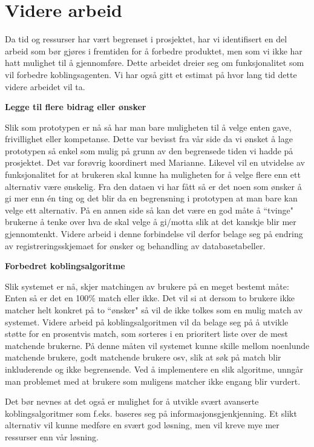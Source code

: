 \section{Videre arbeid}

Da tid og ressurser har vært begrenset i prosjektet, har vi identifisert en del arbeid som bør gjøres i fremtiden for å forbedre produktet, men som vi ikke har hatt mulighet til å gjennomføre. Dette arbeidet dreier seg om funksjonalitet som vil forbedre koblingsagenten. Vi har også gitt et estimat på hvor lang tid dette videre arbeidet vil ta.

{\bf Legge til flere bidrag eller ønsker}

Slik som prototypen er nå så har man bare muligheten til å velge enten gave, frivillighet eller kompetanse. Dette var bevisst fra vår side da vi ønsket å lage prototypen så enkel som mulig på grunn av den begrensede tiden vi hadde på prosjektet. Det var forøvrig koordinert med Marianne. Likevel vil en utvidelse av funksjonalitet for at brukeren skal kunne ha muligheten for å velge flere enn ett alternativ være ønskelig. Fra den dataen vi har fått så er det noen som ønsker å gi mer enn én ting og det blir da en begrensning i prototypen at man bare kan velge ett alternativ. På en annen side så kan det være en god måte å ``tvinge" brukerne å tenke over hva de skal velge å gi/motta slik at det kanskje blir mer gjennomtenkt. Videre arbeid i denne forbindelse vil derfor belage seg på endring av registreringsskjemaet for ønsker og behandling av databasetabeller.

{\bf Forbedret koblingsalgoritme}

Slik systemet er nå, skjer matchingen av brukere på en meget bestemt måte: Enten så er det en 100\% match eller ikke. Det vil si at dersom to brukere ikke matcher helt konkret på to ``ønsker" så vil de ikke tolkes som en mulig match av systemet. Videre arbeid på koblingsalgoritmen vil da belage seg på å utvikle støtte for en prosentvis match, som sorteres i en prioritert liste over de mest matchende brukerne. På denne måten vil systemet kunne skille mellom noenlunde matchende brukere, godt matchende brukere osv, slik at søk på match blir inkluderende og ikke begrensende. Ved å implementere en slik algoritme, unngår man problemet med at brukere som muligens matcher ikke engang blir vurdert.

Det bør nevnes at det også er mulighet for å utvikle svært avanserte koblingsalgoritmer som f.eks. baseres seg på informasjonsgjenkjenning. Et slikt alternativ vil kunne medføre en svært god løsning, men vil kreve mye mer ressurser enn vår løsning.

